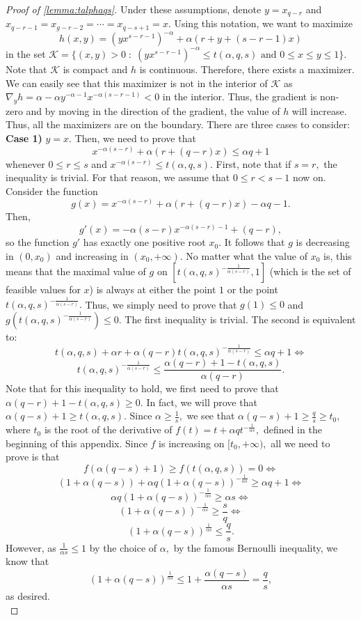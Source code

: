 \documentclass[11pt]{article}%
\numberwithin{theorem}{subsection}
\begin{document}
\begin{proof}[Proof of \cref{lemma:talphaqs}]
\noindent
Under these assumptions, denote $y = x_{q-r}$ and
$x_{q-r-1} = x_{g-r-2} = \cdots = x_{q-s+1}   = x.$ Using this notation, we want to maximize 
$$
h(x,y) = (yx^{s-r-1})^{-\alpha} + \alpha(r + y + (s-r-1)x)
$$
in the set $\mathcal{K}=\{(x,y)>0 \; :\;(yx^{s-r-1})^{-\alpha} \le t(\alpha, q, s)\text{ and }0\le x\le y \le 1\}.$ Note that $\mathcal{K}$ is compact and $h$ is continuous. Therefore, there exists a maximizer. We can easily see that this maximizer is not in the interior of $\mathcal{K}$ as $\nabla_y h =  \alpha - \alpha y^{-\alpha - 1}x^{-\alpha (s-r-1)} <0$ in the interior. Thus, the gradient is non-zero and by moving in the direction of the gradient, the value of $h$ will increase. Thus, all the maximizers are on the boundary. There are three cases to consider:\\
\textbf{Case 1)} $y = x.$ Then, we need to prove that 
$$
x^{-\alpha (s-r)} + \alpha (r + (q-r)x)\le \alpha q + 1
$$
whenever $0\le r \le s$ and $x^{-\alpha (s-r)}\le t(\alpha, q, s).$ First, note that if $s = r,$ the inequality is trivial. For that reason, we assume that $0\le r <s-1$ now on. Consider the function $$g(x) = x^{-\alpha (s-r)} + \alpha (r + (q-r)x) - \alpha q - 1.$$ Then, 
$$
g'(x) = 
-\alpha(s-r)x^{-\alpha(s-r)-1} + (q-r),
$$
so the function $g'$ has  exactly one positive root $x_0.$ It follows that $g$ is decreasing in $(0,x_0)$ and increasing in $(x_0,+\infty).$ No matter what the value of $x_0$ is, this means that the maximal value of $g$ on $[t(\alpha, q, s)^{-\frac{1}{\alpha(s-r)}},1]$ (which is the set of feasible values for $x$) is always at either the point $1$ or the point $t(\alpha, q, s)^{-\frac{1}{\alpha(s-r)}}.$ Thus, we simply need to prove that $g(1)\le 0$ and 
$g(t(\alpha, q, s)^{-\frac{1}{\alpha(s-r)}})\le 0.$ The first inequality is trivial. The second is equivalent to:
$$
t(\alpha, q, s) + 
\alpha r  + \alpha(q-r)t(\alpha, q, s)^{-\frac{1}{\alpha(s-r)}}\le \alpha q + 1 \Longleftrightarrow
$$
$$
t(\alpha,q,s)^{-\frac{1}{\alpha(s-r)}}
\le \frac{\alpha (q-r)+1 - t(\alpha,q,s)}{\alpha (q-r)}.
$$
Note that for this inequality to hold, we first need to prove that $\alpha (q-r)+1 - t(\alpha,q,s)\ge 0.$ In fact, we will prove that 
$
\alpha (q-s)+1 \ge  t(\alpha,q,s).$ Since $\alpha \ge \frac{1}{s},$ we see that $\alpha (q-s)+1 \ge \frac{q}{s}\ge t_0,$ where $t_0$ is the root of the derivative of $f(t) = t + \alpha qt^{-\frac{1}{\alpha s}},$ defined in the beginning of this appendix. Since $f$ is increasing on $[t_0,+\infty),$ all we need to prove is that 
$$
f(\alpha (q-s)+1)\ge 
f(t({\alpha,q,s})) = 0 \Longleftrightarrow
$$
$$
(1 + \alpha(q-s)) + \alpha q (1+\alpha (q-s))^{-\frac{1}{\alpha s}}\ge \alpha q + 1 \Longleftrightarrow
$$
$$
\alpha q (1+\alpha (q-s))^{-\frac{1}{\alpha s}} \ge \alpha s \Longleftrightarrow
$$
$$
(1+\alpha (q-s))^{-\frac{1}{\alpha s}} \ge \frac{s}{q} \Longleftrightarrow
$$
$$
(1+\alpha (q-s))^{\frac{1}{\alpha s}} \le \frac{q}{s}.
$$
However, as $\frac{1}{\alpha s}\le 1$ by the choice of $\alpha, $ by the famous Bernoulli inequality, we know that 
$$
(1+\alpha (q-s))^{\frac{1}{\alpha s}}\le 
1 + \frac{\alpha (q-s)}{\alpha s} = \frac{q}{s},
$$
as desired.\\



\end{proof}
\end{document}

